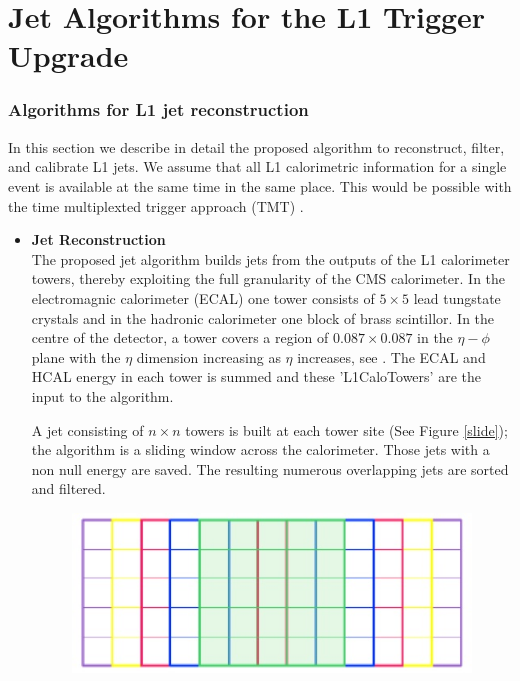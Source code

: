 \chapter{Jet Algorithms for the L1 Trigger Upgrade}
\label{chap:l1jets}


\subsection{\sc Algorithms for L1 jet reconstruction}
\label{Sec:Algo}
In this section we describe in detail the proposed algorithm to reconstruct, filter, 
and calibrate L1 jets.
We assume that all L1 calorimetric information for a single event is available at 
the same time in the same place. This would be possible with the time multiplexted trigger approach (TMT) \cite{TMT}.


\begin{itemize}

\item {\bf Jet Reconstruction} \\
The proposed jet algorithm builds jets from the outputs of the L1 calorimeter towers, thereby
exploiting the full granularity of the CMS calorimeter. 
In the electromagnic calorimeter (ECAL) one tower consists of $5 \times 5$ 
lead tungstate crystals and in the hadronic calorimeter one block of brass scintillor. 
In the centre of the detector, a tower covers a region of $0.087\times0.087$ in the $\eta-\phi$ plane with the $\eta$ dimension increasing as $\eta$ increases, see \cite{CMSdetector}.
The ECAL and HCAL energy in each tower is summed and these 'L1CaloTowers' are the input to the algorithm. 

A jet consisting of $n \times n$ towers is built at each tower site (See Figure \ref{slide}); 
the algorithm is a sliding window across the calorimeter.
Those jets with a non null energy are saved. 
The resulting numerous overlapping jets are sorted and filtered.

\begin{figure}[h]
\begin{center}
  \includegraphics[scale=0.37]{Figures/l1jets/JetOverlaps.jpg}


\end{center}
\end{figure}
\end{itemize}

